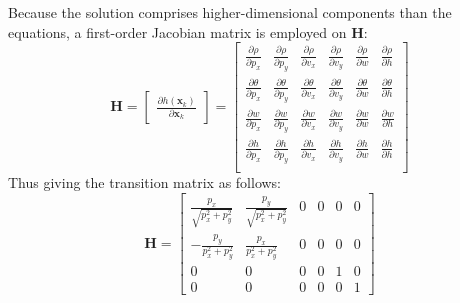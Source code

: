 Because the solution comprises higher-dimensional components than the equations, 
a first-order Jacobian matrix is employed on $\mathbf{H}$: 
\begingroup
        \large
        \begin{equation}
            \mathbf{H}=
            \begin{bmatrix}
                \frac{\partial h(\mathbf{x}_k)}{\partial \mathbf{x}_k}
            \end{bmatrix}=
            \begin{bmatrix}
                \frac{\partial \rho}{\partial p_x} & \frac{\partial \rho}{\partial p_y}
                & \frac{\partial \rho}{\partial v_x}& \frac{\partial \rho}{\partial v_y} 
                & \frac{\partial \rho}{\partial w}& \frac{\partial \rho}{\partial h}\\
        
                \frac{\partial \theta}{\partial p_x} & \frac{\partial \theta}{\partial p_y} 
                & \frac{\partial \theta}{\partial v_x}& \frac{\partial \theta}{\partial v_y} 
                & \frac{\partial \theta}{\partial w}& \frac{\partial \theta}{\partial h} \\

                \frac{\partial w}{\partial p_x} & \frac{\partial w}{\partial p_y} 
                & \frac{\partial w}{\partial v_x}& \frac{\partial w}{\partial v_y} 
                & \frac{\partial w}{\partial w}& \frac{\partial w}{\partial h} \\

                \frac{\partial h}{\partial p_x} & \frac{\partial h}{\partial p_y} 
                & \frac{\partial h}{\partial v_x}& \frac{\partial h}{\partial v_y} 
                & \frac{\partial h}{\partial w}& \frac{\partial h}{\partial h} \\
            \end{bmatrix}
        \end{equation}
    Thus giving the transition matrix as follows:    
    \begin{equation}
            \mathbf{H}=
            \begin{bmatrix}
                \frac{p_x}{\sqrt{p_x^2+p_y^2}} & \frac{p_y}{\sqrt{p_x^2+p_y^2}} & 0 & 0 & 0 & 0\\
                -\frac{p_y}{p_x^2+p_y^2} & \frac{p_x}{p_x^2+p_y^2} & 0 & 0 & 0 & 0\\
                0 & 0 & 0 & 0 & 1 & 0\\
                0 & 0 & 0 & 0 & 0 & 1
            \end{bmatrix}
        \end{equation}
    \endgroup